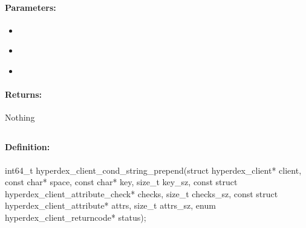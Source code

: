 \paragraph{Parameters:}
\begin{itemize}[noitemsep]
\item {}\\

\item {}\\

\item {}\\

\end{itemize}

\paragraph{Returns:}
Nothing
\pagebreak
\subsection{}
\label{api:c:cond_string_prepend}


\paragraph{Definition:}
\begin{ccode}
int64_t hyperdex_client_cond_string_prepend(struct hyperdex_client* client,
        const char* space,
        const char* key, size_t key_sz,
        const struct hyperdex_client_attribute_check* checks, size_t checks_sz,
        const struct hyperdex_client_attribute* attrs, size_t attrs_sz,
        enum hyperdex_client_returncode* status);
\end{ccode}

